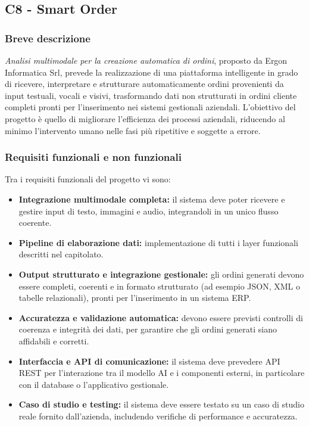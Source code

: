 \documentclass[a4paper,11pt]{article}
\begin{document}
\subsection{C8 - Smart Order}
\subsubsection{Breve descrizione}
\parbox[h]{\linewidth}{%
\textit{Analisi multimodale per la creazione automatica di
ordini}, proposto da Ergon Informatica Srl, prevede la realizzazione di una
piattaforma intelligente in grado di ricevere, interpretare e strutturare
automaticamente ordini provenienti da input testuali, vocali e visivi, trasformando
dati non strutturati in ordini cliente completi pronti per l'inserimento nei sistemi
gestionali aziendali. L'obiettivo del progetto è quello di migliorare l'efficienza dei
processi aziendali, riducendo al minimo l'intervento umano nelle fasi più ripetitive
e soggette a errore.
}

\subsubsection{Requisiti funzionali e non funzionali}
Tra i requisiti funzionali del progetto vi sono:
\begin{itemize}
  \item \textbf{Integrazione multimodale completa:} il sistema deve poter ricevere e gestire input di testo, immagini e audio, integrandoli in un unico flusso coerente.
  \item \textbf{Pipeline di elaborazione dati:} implementazione di tutti i layer funzionali descritti nel capitolato.
  \item \textbf{Output strutturato e integrazione gestionale:} gli ordini generati devono essere completi, coerenti e in formato strutturato (ad esempio JSON, XML o tabelle relazionali), pronti per l’inserimento in un sistema ERP.
  \item \textbf{Accuratezza e validazione automatica:} devono essere previsti controlli di coerenza e integrità dei dati, per garantire che gli ordini generati siano affidabili e corretti.
  \item \textbf{Interfaccia e API di comunicazione:} il sistema deve prevedere API REST per l’interazione tra il modello AI e i componenti esterni, in particolare con il database o l’applicativo gestionale.
  \item \textbf{Caso di studio e testing:} il sistema deve essere testato su un caso di studio reale fornito dall’azienda, includendo verifiche di performance e accuratezza.
\end{itemize}
\end{document}

